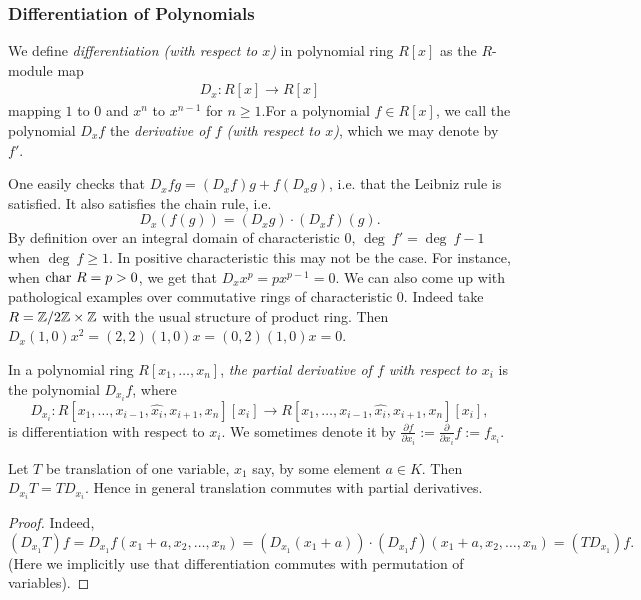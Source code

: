 \subsubsection{Differentiation of Polynomials}
\begin{definition}
    We define \textit{differentiation (with respect to $x$)} in polynomial ring $R[x]$ as the $R$-module map
    \begin{gather*}
        D_x : R[x]\rightarrow R[x]
    \end{gather*}
    mapping $1$ to $0$ and $x^n$ to $x^{n-1}$ for $n\geq 1$.For a polynomial $f\in R[x]$, we call the polynomial $D_xf$ the \textit{derivative of $f$ (with respect to $x$)}, which we may denote by $f'$.
\end{definition}
\begin{remark}
    One easily checks that $D_x fg = (D_xf)g+f(D_xg)$, i.e. that the Leibniz rule is satisfied. It also satisfies the chain rule, i.e. 
    $$D_x(f(g))=(D_xg)\cdot(D_xf)(g).$$
    By definition over an integral domain of characteristic $0$, $\deg \ f' = \deg \ f -1$ when $\deg \ f\geq 1$. In positive characteristic this may not be the case. For instance, when $\mathrm{char}\ R = p >0$, we get that $D_x x^p= px^{p-1}=0$. We can also come up with pathological examples over commutative rings of characteristic $0$. Indeed take $R=\mathbb{Z}/2\mathbb{Z} \times \mathbb{Z}$ with the usual structure of product ring. Then $D_x (1,0)x^2= (2,2)(1,0)x= (0,2)(1,0)x=0.$ 
\end{remark}
\begin{definition}
    In a polynomial ring $R[x_1,\dots,x_n]$, \emph{the partial derivative of $f$ with respect to $x_i$} is the polynomial $D_{x_i}f$, where 
    $$D_{x_i}: R[x_1,\dots, x_{i-1},\widehat{x_i},x_{i+1},x_{n}][x_i]\rightarrow R[x_1,\dots, x_{i-1},\widehat{x_i},x_{i+1},x_{n}][x_i],$$
    is differentiation with respect to $x_i$. We sometimes denote it by $\frac{\partial f}{\partial x_i}:= \frac{\partial}{\partial x_i}f:= f_{x_i}$.
\end{definition}
\begin{lemma}\label{TranslationAndPartialDerivativesCommute}
    Let $T$ be translation of one variable, $x_1$ say, by some element $a\in K$. Then $D_{x_{i}}T=TD_{x_i}$. Hence in general translation commutes with partial derivatives.  
\end{lemma}
\begin{proof}
    Indeed,  
    $$(D_{x_1}T)f = D_{x_1}f(x_1+a,x_2,\dots,x_n) = (D_{x_1}(x_1+a))\cdot (D_{x_1}f)(x_1+a,x_2,\dots,x_n) =(TD_{x_1})f.$$
    (Here we implicitly use that differentiation commutes with permutation of variables).
\end{proof}
